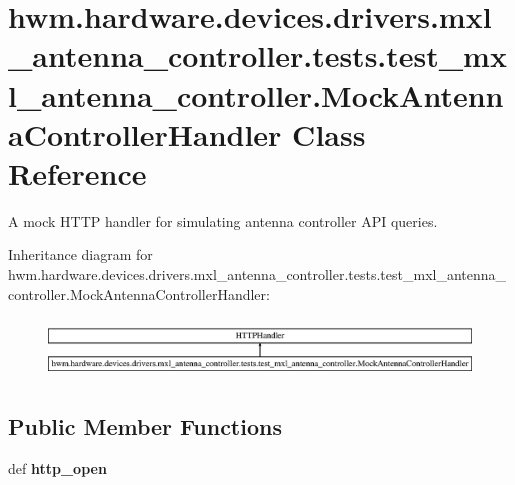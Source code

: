 \hypertarget{classhwm_1_1hardware_1_1devices_1_1drivers_1_1mxl__antenna__controller_1_1tests_1_1test__mxl__an4ff39621ad95421d0c0b0546fd5c2e95}{\section{hwm.\-hardware.\-devices.\-drivers.\-mxl\-\_\-antenna\-\_\-controller.\-tests.\-test\-\_\-mxl\-\_\-antenna\-\_\-controller.\-Mock\-Antenna\-Controller\-Handler Class Reference}
\label{classhwm_1_1hardware_1_1devices_1_1drivers_1_1mxl__antenna__controller_1_1tests_1_1test__mxl__an4ff39621ad95421d0c0b0546fd5c2e95}
}


A mock H\-T\-T\-P handler for simulating antenna controller A\-P\-I queries.  


Inheritance diagram for hwm.\-hardware.\-devices.\-drivers.\-mxl\-\_\-antenna\-\_\-controller.\-tests.\-test\-\_\-mxl\-\_\-antenna\-\_\-controller.\-Mock\-Antenna\-Controller\-Handler\-:\begin{figure}[H]
\begin{center}
\leavevmode
\includegraphics[height=1.593172cm]{classhwm_1_1hardware_1_1devices_1_1drivers_1_1mxl__antenna__controller_1_1tests_1_1test__mxl__an4ff39621ad95421d0c0b0546fd5c2e95}
\end{center}
\end{figure}
\subsection*{Public Member Functions}
\begin{DoxyCompactItemize}
\item 
\hypertarget{classhwm_1_1hardware_1_1devices_1_1drivers_1_1mxl__antenna__controller_1_1tests_1_1test__mxl__an4ff39621ad95421d0c0b0546fd5c2e95_a990b87f3b40cb34bf78c0c50d54c7e84}{def {\bfseries http\-\_\-open}}\label{classhwm_1_1hardware_1_1devices_1_1drivers_1_1mxl__antenna__controller_1_1tests_1_1test__mxl__an4ff39621ad95421d0c0b0546fd5c2e95_a990b87f3b40cb34bf78c0c50d54c7e84}

\end{DoxyCompactItemize}


